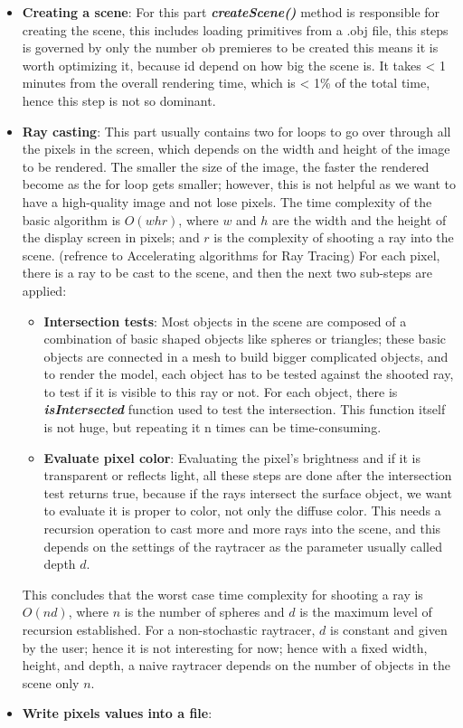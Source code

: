 \documentclass[11pt,a4paper]{article}
\begin{document}
 	\begin{itemize}
 		\item \textbf{Creating a scene}: For this part \textbf{\textit{createScene()}} method is responsible for creating the scene, this includes loading primitives from a .obj file, this steps is governed by only the number ob premieres to be created this means it is worth optimizing it, because id depend on how big the scene is.   It takes < 1 minutes from the overall rendering time, which is < 1\% of the total time, hence this step is not so dominant.
 		\item  \textbf{Ray casting}: This part usually contains two for loops to go over through all the pixels in the screen, which depends on the width and height of the image to be rendered. The smaller the size of the image, the faster the rendered become as the for loop gets smaller; however, this is not helpful as we want to have a high-quality image and not lose pixels.
 		The time complexity of the basic algorithm is $ O(w hr) $, where $ w $ and $ h $ are the width and the height of the display screen in pixels; and $ r $ is the complexity of shooting a ray into the scene. (refrence to Accelerating algorithms for Ray Tracing)
 		 For each pixel, there is a ray to be cast to the scene, and then the next two sub-steps are applied: 
 			\begin{itemize}
 			 \item \textbf{Intersection tests}: Most objects in the scene are composed of a combination of basic shaped objects like spheres or triangles; these basic objects are connected in a mesh to build bigger complicated objects, and to render the model, each object has to be tested against the shooted ray, to test if it is visible to this ray or not. For each object, there is \textbf{\textit{isIntersected}} function used to test the intersection. This function itself is not huge, but repeating it n times can be time-consuming.
 			\item  \textbf{Evaluate pixel color}: Evaluating the pixel's brightness and if it is transparent or reflects light, all these steps are done after the intersection test returns true, because if the rays intersect the surface object, we want to evaluate it is proper to color, not only the diffuse color. This needs a recursion operation to cast more and more rays into the scene, and this depends on the settings of the raytracer as the parameter usually called depth $ d $.
 			\end{itemize}
 		
 		This concludes that the worst case time complexity for shooting a ray is $ O(nd) $, where $ n $ is the number of spheres and $ d $ is the maximum level of recursion established.
 		For a non-stochastic raytracer, $ d $ is constant and given by the user; hence it is not interesting for now; hence with a fixed width, height, and depth, a naive raytracer depends on the number of objects in the scene only $ n $. 
 		\item \textbf{Write pixels values into a file}:
 		   
 	\end{itemize}
 
\end{document}
